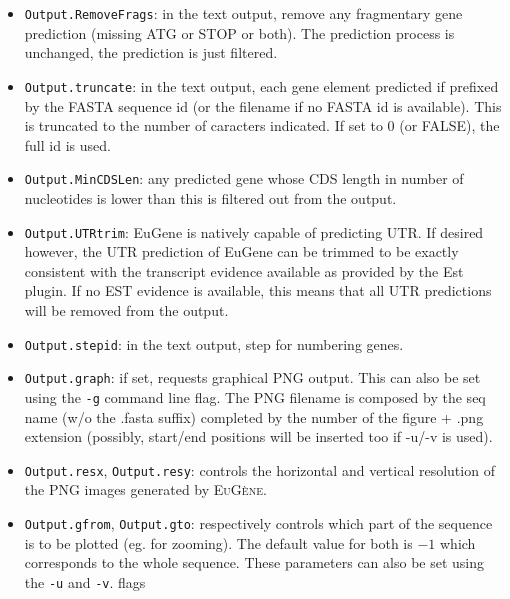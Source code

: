 \documentclass[a4paper,titlepage]{report}
\newcommand{\EuGene}{\textsc{EuG\`ene}}
\begin{document}
\begin{itemize}
\item \texttt{Output.RemoveFrags}: in the text output, remove any 
fragmentary gene prediction (missing ATG or STOP or both). The prediction
process is unchanged,  the prediction is just filtered. 

\item \texttt{Output.truncate}: in the text output, each gene element
  predicted if prefixed by the FASTA sequence id (or the filename if
  no FASTA id is available). This is truncated to the number of
  caracters indicated. If set to 0 (or FALSE), the full id is used.

\item \texttt{Output.MinCDSLen}: any predicted gene whose CDS length
  in number of nucleotides is lower than this is filtered out from the
  output.

\item \texttt{Output.UTRtrim}: EuGene is natively capable of
  predicting UTR. If desired however, the UTR prediction of EuGene can
  be trimmed to be exactly consistent with the transcript evidence
  available as provided by the Est plugin. If no EST evidence is
  available, this means that all UTR predictions will be removed from
  the output.

\item \texttt{Output.stepid}: in the text output, step for numbering genes.

\item \texttt{Output.graph}: if set, requests graphical PNG output.
  This can also be set using the \texttt{-g} command line flag. 
  The PNG filename is composed by the seq name (w/o the .fasta suffix) completed by
  the number of the figure + .png extension (possibly,
  start/end positions will be inserted too if -u/-v is used).
  
\item \texttt{Output.resx}, \texttt{Output.resy}: controls the
  horizontal and vertical resolution of the PNG images generated by
  \EuGene. 
  
\item \texttt{Output.gfrom}, \texttt{Output.gto}: respectively
  controls which part of the sequence is to be plotted (eg. for
  zooming). The default value for both is $-1$ which corresponds to
  the whole sequence. These parameters can also be set using the
  \texttt{-u} and \texttt{-v}. flags 


\end{itemize}
\end{document}
